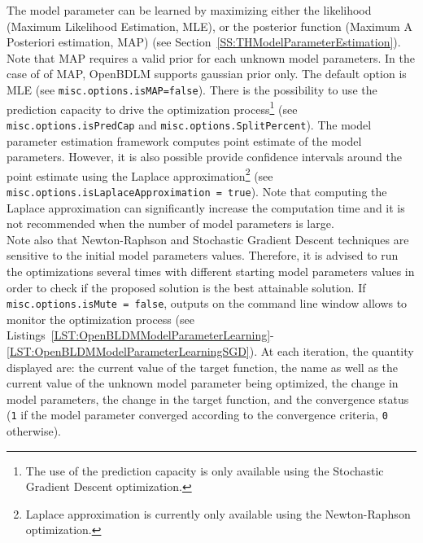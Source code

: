 The model parameter can be learned by maximizing either the likelihood (Maximum Likelihood Estimation, MLE), or the posterior function (Maximum A Posteriori estimation, MAP) (see Section~\ref{SS:THModelParameterEstimation}). 
Note that MAP requires a valid prior for each unknown model parameters.
In the case of of MAP, OpenBDLM supports gaussian prior only.
The default option is MLE (see \lstinline[basicstyle = \mlttfamily \small ]!misc.options.isMAP=false!).
There is the possibility to use the prediction capacity to drive the optimization process\footnote{The use of the prediction capacity is only available using the Stochastic Gradient Descent optimization.} (see  \lstinline[basicstyle = \mlttfamily \small ]!misc.options.isPredCap! and \lstinline[basicstyle = \mlttfamily \small ]!misc.options.SplitPercent!). The model parameter estimation framework computes point estimate of the model parameters. 
However, it is also possible provide confidence intervals around the point estimate using the Laplace approximation\footnote{Laplace approximation is currently only available using the Newton-Raphson optimization.} (see \lstinline[basicstyle = \mlttfamily \small ]!misc.options.isLaplaceApproximation = true!).
Note that computing the Laplace approximation can significantly increase the computation time and it is not recommended when the number of model parameters is large.\\

Note also that Newton-Raphson and Stochastic Gradient Descent techniques are sensitive to the initial model parameters values. 
Therefore, it is advised to run the optimizations several times with different starting model parameters values in order to check if the proposed solution is the best attainable solution.
If \lstinline[basicstyle = \mlttfamily \small ]!misc.options.isMute = false!, outputs on the \MATLAB{} command line window allows to monitor the optimization process (see Listings~\ref{LST:OpenBLDMModelParameterLearning}-\ref{LST:OpenBLDMModelParameterLearningSGD}).
At each iteration, the quantity displayed are: the current value of the target function, the name as well as the current value of the unknown model parameter being optimized, the change in model parameters, the change in the target function, and the convergence status (\lstinline[basicstyle = \mlttfamily \small ]!1! if the model parameter converged according to the convergence criteria, \lstinline[basicstyle = \mlttfamily \small ]!0! otherwise).\\

